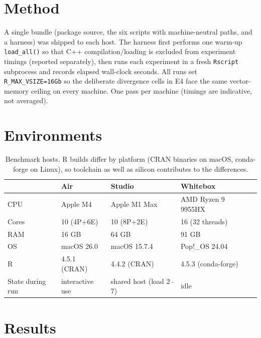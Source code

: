 \documentclass[11pt]{article}
\begin{document}
\section{Method}

A single bundle (package source, the six scripts with machine-neutral paths,
and a harness) was shipped to each host. The harness first performs one
warm-up \texttt{load\_all()} so that C++ compilation/loading is excluded from
experiment timings (reported separately), then runs each experiment in a fresh
\texttt{Rscript} subprocess and records elapsed wall-clock seconds. All runs
set \texttt{R\_MAX\_VSIZE=16Gb} so the deliberate divergence cells in E4 face
the same vector-memory ceiling on every machine. One pass per machine
(timings are indicative, not averaged).

\section{Environments}

\begin{table}[h]
\centering\small
\begin{tabular}{lllll}
\toprule
 & \textbf{Air} & \textbf{Studio} & \textbf{Whitebox} \\
\midrule
CPU & Apple M4 & Apple M1 Max & AMD Ryzen 9 9955HX \\
Cores & 10 (4P+6E) & 10 (8P+2E) & 16 (32 threads) \\
RAM & 16 GB & 64 GB & 91 GB \\
OS & macOS 26.0 & macOS 15.7.4 & Pop!\_OS 24.04 \\
R & 4.5.1 (CRAN) & 4.4.2 (CRAN) & 4.5.3 (conda-forge) \\
State during run & interactive use & shared host (load 2--7) & idle \\
\bottomrule
\end{tabular}
\caption{Benchmark hosts. R builds differ by platform (CRAN binaries on macOS,
conda-forge on Linux), so toolchain as well as silicon contributes to the
differences.}
\end{table}

\section{Results}
\end{document}
